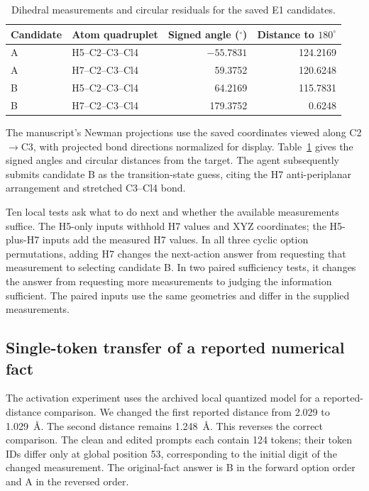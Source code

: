 \begin{table}[!htbp]
\centering\small
\caption{Dihedral measurements and circular residuals for the saved E1 candidates.}
\label{tab:si-target-dihedrals}
\begin{tabular}{llrr}
\toprule
Candidate & Atom quadruplet & Signed angle ($^\circ$) & Distance to $180^\circ$\\
\midrule
A & H5--C2--C3--Cl4 & $-55.7831$ & 124.2169\\
A & H7--C2--C3--Cl4 & 59.3752 & 120.6248\\
B & H5--C2--C3--Cl4 & 64.2169 & 115.7831\\
B & H7--C2--C3--Cl4 & 179.3752 & 0.6248\\
\bottomrule
\end{tabular}
\end{table}

The manuscript's Newman projections use the saved coordinates viewed along C2$\to$C3, with projected bond directions normalized for display. Table~\ref{tab:si-target-dihedrals} gives the signed angles and circular distances from the target. The agent subsequently submits candidate B as the transition-state guess, citing the H7 anti-periplanar arrangement and stretched C3--Cl4 bond.

Ten local tests ask what to do next and whether the available measurements suffice. The H5-only inputs withhold H7 values and XYZ coordinates; the H5-plus-H7 inputs add the measured H7 values. In all three cyclic option permutations, adding H7 changes the next-action answer from requesting that measurement to selecting candidate B. In two paired sufficiency tests, it changes the answer from requesting more measurements to judging the information sufficient. The paired inputs use the same geometries and differ in the supplied measurements.

\subsection{Single-token transfer of a reported numerical fact}

The activation experiment uses the archived local quantized model for a reported-distance comparison.\citep{ref16} We changed the first reported distance from 2.029 to 1.029~\AA. The second distance remains 1.248~\AA. This reverses the correct comparison. The clean and edited prompts each contain 124 tokens; their token IDs differ only at global position 53, corresponding to the initial digit of the changed measurement. The original-fact answer is B in the forward option order and A in the reversed order.

